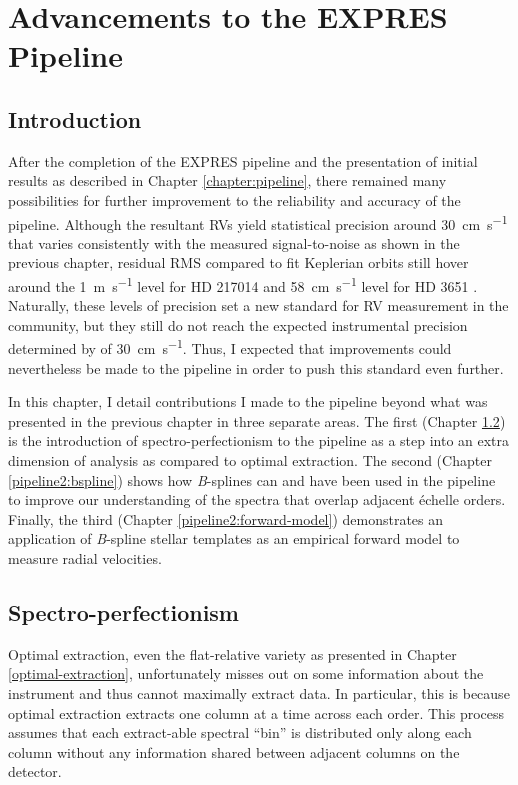 \chapter{Advancements to the EXPRES Pipeline} \label{chapter:pipeline2}

\section{Introduction}

After the completion of the EXPRES pipeline and the presentation of initial results as described in Chapter \ref{chapter:pipeline}, there remained many possibilities for further improvement to the reliability and accuracy of the pipeline. Although the resultant RVs yield statistical precision around 30~\si{\centi\meter\per\second} that varies consistently with the measured signal-to-noise as shown in the previous chapter, residual RMS compared to fit Keplerian orbits still hover around the 1~\si{\meter\per\second} level for HD 217014 \citep{petersburg_extreme-precision_2020} and 58~\si{\centi\meter\per\second} level for HD 3651 \citep{brewer_expres_2020}. Naturally, these levels of precision set a new standard for RV measurement in the community, but they still do not reach the expected instrumental precision determined by \citet{blackman_performance_2020} of 30~\si{\centi\meter\per\second}. Thus, I expected that improvements could nevertheless be made to the pipeline in order to push this standard even further.

In this chapter, I detail contributions I made to the pipeline beyond what was presented in the previous chapter in three separate areas. The first (Chapter \ref{pipeline2:spec-perf}) is the introduction of spectro-perfectionism to the pipeline as a step into an extra dimension of analysis as compared to optimal extraction. The second (Chapter \ref{pipeline2:bspline}) shows how \textit{B}-splines can and have been used in the pipeline to improve our understanding of the spectra that overlap adjacent \'{e}chelle orders. Finally, the third (Chapter \ref{pipeline2:forward-model}) demonstrates an application of \textit{B}-spline stellar templates as an empirical forward model to measure radial velocities.

\section{Spectro-perfectionism} \label{pipeline2:spec-perf}

Optimal extraction, even the flat-relative variety as presented in Chapter \ref{optimal-extraction}, unfortunately misses out on some information about the instrument and thus cannot maximally extract data. In particular, this is because optimal extraction extracts one column at a time across each order. This process assumes that each extract-able spectral ``bin'' is distributed only along each column without any information shared between adjacent columns on the detector.

